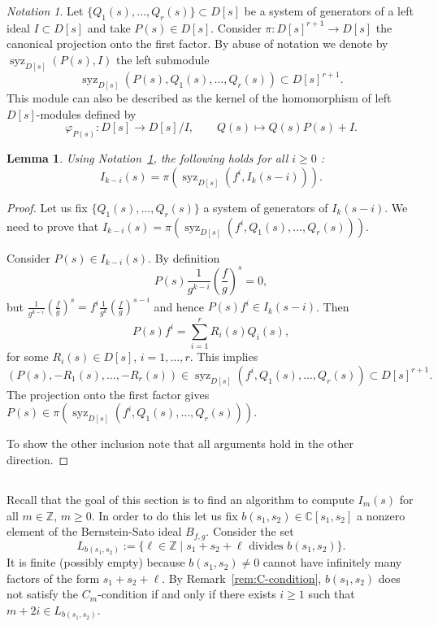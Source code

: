 \documentclass[a4paper,12pt]{amsart}
\theoremstyle{plain}
\newtheorem{lemma}[theorem]{Lemma}
\theoremstyle{definition}
\theoremstyle{remark}
\newtheorem{notation}[theorem]{Notation}
\def\CC{\mathbb{C}}
\def\ZZ{\mathbb{Z}}
\DeclareMathOperator{\syz}{syz}
\begin{document}
\begin{notation}\label{notation-syz}
Let $\{Q_1(s), \ldots, Q_r(s)\} \subset D[s]$ be a system of generators of a left ideal $I \subset D[s]$ and take $P(s) \in D[s]$. Consider $\pi : D[s]^{r+1} \to D[s]$ the canonical  projection onto the first factor.
By abuse of notation we denote by $\syz_{D[s]}(P(s),I)$ the left submodule 
\[\syz_{D[s]}(P(s),Q_1(s),\ldots,Q_r(s)) \subset D[s]^{r+1}.
\]
This module can also be described as the kernel of the homomorphism of left $D[s]$-modules defined by
\[
\varphi_{P(s)}: D[s] \longrightarrow D[s]/I, \qquad Q(s) \mapsto Q(s) P(s) + I.
\]
\end{notation}

\begin{lemma}\label{lemmma:syz}
Using Notation~\ref{notation-syz}, the following holds for all $i \geq 0$ :
\[
I_{k-i}(s) = \pi\left(\syz_{D[s]}\left(f^i,I_k\left(s-i\right)\right)\right).
\]

\end{lemma}

\begin{proof}
Let us fix $\{Q_1(s),\ldots,Q_r(s)\}$ a system of generators of $I_k(s-i)$.
We need to prove that $I_{k-i}(s) = \pi(\syz_{D[s]}(f^i,Q_1(s),\ldots,Q_r(s)))$. 

Consider $P(s) \in I_{k-i}(s)$. By definition
\[
P(s) \frac{1}{g^{k-i}} \left( \frac{f}{g} \right)^s = 0,
\]
but $\frac{1}{g^{k-i}} \left( \frac{f}{g} \right)^s = f^i \frac{1}{g^k} \left( \frac{f}{g} \right)^{s-i}$
and hence $P(s) f^i \in I_k(s-i)$.
Then
\[
P(s) f^i = \sum_{i=1}^r R_i(s) Q_i(s),
\]
for some $R_i(s) \in D[s]$, $i=1,\ldots,r$. This implies
\[
(P(s),-R_1(s),\ldots,-R_r(s)) \in \syz_{D[s]} (f^i,Q_1(s),\ldots,Q_r(s)) \subset D[s]^{r+1}.
\]
The projection onto the first factor gives $P(s) \in \pi(\syz_{D[s]} (f^i,Q_1(s),\ldots,Q_r(s)))$.

To show the other inclusion note that all arguments hold in the other direction.
\end{proof}

\subsection{}\label{sec:L-discussion}
Recall that the goal of this section is to find an algorithm to compute $I_m(s)$ for all $m \in \ZZ$, $m \geq 0$.
In order to do this let us fix $b(s_1,s_2) \in \CC[s_1,s_2]$ a nonzero element of the Bernstein-Sato ideal $B_{f,g}$.
Consider the set
\[
L_{b(s_1,s_2)} := \Big\{ \ell \in \ZZ \mid s_1 + s_2 + \ell \mbox{ divides } b(s_1,s_2) \Big\}.
\]
It is finite (possibly empty) because $b(s_1,s_2) \neq 0$ cannot have infinitely many factors of the form $s_1 + s_2+\ell$.
By Remark~\ref{rem:C-condition}, $b(s_1,s_2)$ does not satisfy the $C_m$-condition if and only if
there exists $i \geq 1$ such that $m+2i \in L_{b(s_1,s_2)}$.
\end{document}
